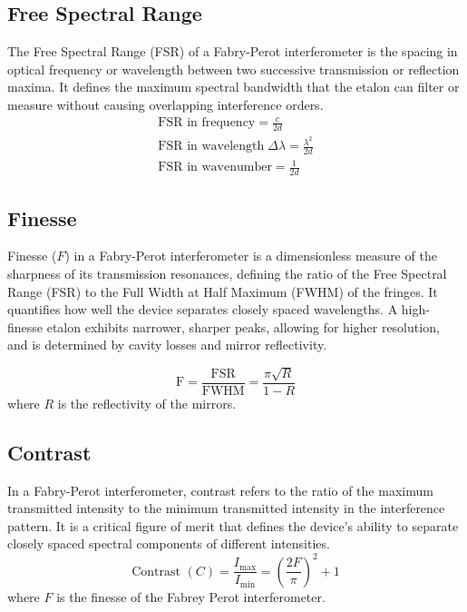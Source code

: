 \subsection{Free Spectral Range}
The Free Spectral Range (FSR) of a Fabry-Perot interferometer is the spacing in optical frequency or wavelength between two successive transmission or reflection maxima. It defines the maximum spectral bandwidth that the etalon can filter or measure without causing overlapping interference orders.
\begin{equation}
    \begin{gathered}
        \text{FSR in frequency} = \frac{c}{2d}  \\
        \text{FSR in wavelength} \; \Delta \lambda =  \frac{\lambda^2}{2d} \\ 
        \text{FSR in wavenumber} = \frac{1}{2d}
    \end{gathered}
\end{equation}
\subsection{Finesse}
Finesse (\(F\)) in a Fabry-Perot interferometer is a dimensionless measure of the sharpness of its transmission resonances, defining the ratio of the Free Spectral Range (FSR) to the Full Width at Half Maximum (FWHM) of the fringes. It quantifies how well the device separates closely spaced wavelengths. A high-finesse etalon exhibits narrower, sharper peaks, allowing for higher resolution, and is determined by cavity losses and mirror reflectivity.

\begin{equation}
    \text{F} = \frac{\text{FSR}}{\text{FWHM}} = \frac{\pi\sqrt{R}}{1 - R}
\end{equation}
where \(R\) is the reflectivity of the mirrors.

\subsection{Contrast}
In a Fabry-Perot interferometer, contrast refers to the ratio of the maximum transmitted intensity to the minimum transmitted intensity in the interference pattern. It is a critical figure of merit that defines the device's ability to separate closely spaced spectral components of different intensities.
\begin{equation}
\text{Contrast } (C) = \frac{I_{\max}}{I_{\min}}
= \left( \frac{2F}{\pi} \right)^2 + 1
\end{equation}
where $F$ is the finesse of the Fabrey Perot interferometer.

